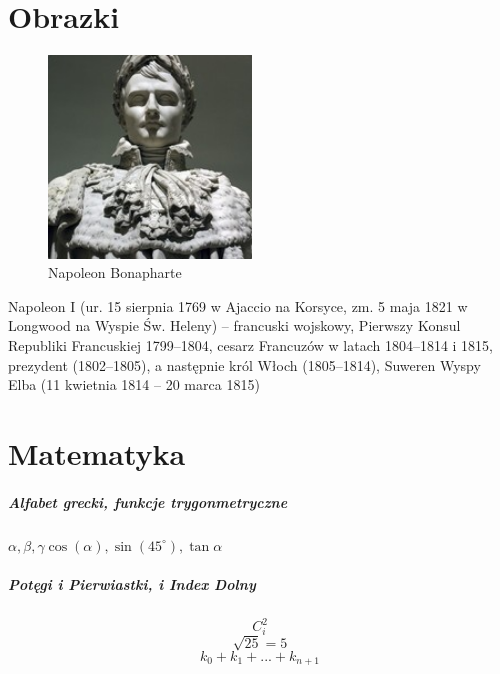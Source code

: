 \documentclass[a4paper, 11pt]{article}
\begin{document}
\section{Obrazki}
\begin{figure}
\begin{center}
\vspace{-20pt} %
\includegraphics[width=0.48\textwidth]{obrazek1}
\end{center}
\caption{Napoleon Bonapharte}
\end{figure}
Napoleon I (ur. 15 sierpnia 1769 w Ajaccio na Korsyce, zm. 5 maja 1821 w Longwood na Wyspie Św. Heleny) – francuski wojskowy, Pierwszy Konsul Republiki Francuskiej 1799–1804, cesarz Francuzów w latach 1804–1814 i 1815, prezydent (1802–1805), a następnie król Włoch (1805–1814), Suweren Wyspy Elba (11 kwietnia 1814 – 20 marca 1815)





\newpage %
\section{Matematyka}
\subparagraph{Alfabet grecki, funkcje trygonmetryczne}
\begin{math}
\alpha, \beta,  \gamma
\cos (\alpha), \sin (45^\circ ), \tan\alpha
\end{math}
\subparagraph{Potęgi i Pierwiastki, i Index Dolny}
$$ C_i^2 $$
$$ \sqrt{25} = 5 $$
$$ k_0 + k_1 + ... + k_{n+1} $$ %
\end{document}
